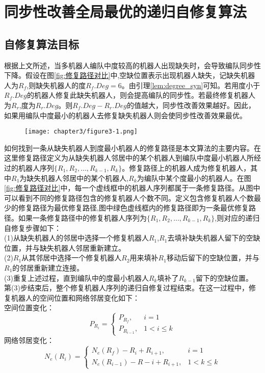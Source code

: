 
\chapter{同步性改善全局最优的递归自修复算法}

\section{自修复算法目标}
根据上文所述，当多机器人编队中度较高的机器人出现缺失时，会导致编队同步性下降。假设在图\ref{fig:修复路径对比}中,空缺位置表示出现机器人缺失，记缺失机器人为$R_f$,则缺失机器人的度${R_f}.Deg = 6$。由引理\ref{lem:degree_syn}可知。若用度小于$R_f.Deg$的机器人修复此缺失机器人，则会提高编队的同步性。若最终修复机器人为$R_r$,度为$R_r.Deg$。则$R_f.Deg-R_r.Deg$的值越大，同步性改善效果越好。因此，如果用编队中度最小的机器人去修复缺失机器人则会使同步性改善效果最优。
\begin{figure}[!htbp]
	\centering
	\texttt{[image: chapter3/figure3-1.png]}
\end{figure}

如何找到一条从缺失机器人到度最小机器人的修复路径是本文算法的主要内容。在这里修复路径定义为从缺失机器人邻居中的某个机器人到编队中度最小机器人所经过的机器人序列$\{R_1,R_2,\dots,R_{k-1},R_k\}$。修复路径上的机器人成为修复机器人，其中$R_1$为缺失机器人邻居中的某个机器人,$R_k$为编队中某个度最小的机器人。在图\ref{fig:修复路径对比}中，每一个虚线框中的机器人序列都属于一条修复路径。从图中可以看到不同的修复路径包含的修复机器人个数不同。定义包含修复机器人个数最少的修复路径为最优修复路径,图中绿色虚线框内的修复路径即为一条最优修复路径。如果一条修复路径中的修复机器人序列为$\{R_1,R_2,\dots,R_{k-1},R_k\}$,则对应的递归自修复步骤如下：\\
\indent (1)从缺失机器人的邻居中选择一个修复机器人$R_1$,$R_1$去填补缺失机器人留下的空缺位置，并与缺失机器人邻居重新建立。\\
\indent (2)$R_1$从其邻居中选择一个修复机器人$R_2$用来填补$R_1$移动后留下的空缺位置，并与$R_1$的邻居重新建立连接。\\
\indent (3)重复上述过程，直到编队中的度最小机器人$R_k$填补了$R_{k-1}$留下的空缺位置。\\
第(3)步结束后，整个修复机器人序列的递归自修复过程结束。在这一过程中，修复机器人的空间位置和网络邻居变化如下：\\
空间位置变化：\\
\begin{equation}
	P_{R_i} = 
	\begin{cases}
		P_{R_f}, & i=1 \\
		P_{R_{i-1}}, & 1 < i \leq k
	\end{cases}
\end{equation}
网络邻居变化：\\
\begin{equation}
	N_e(R_i) = 
	\begin{cases}
		N_e(R_f) - R_i + R_{i+1}, & i = 1 \\
		N_e(R_{i-1}) - R-i + R_{i+1}, & 1<k \leq k
	\end{cases}
\end{equation}

